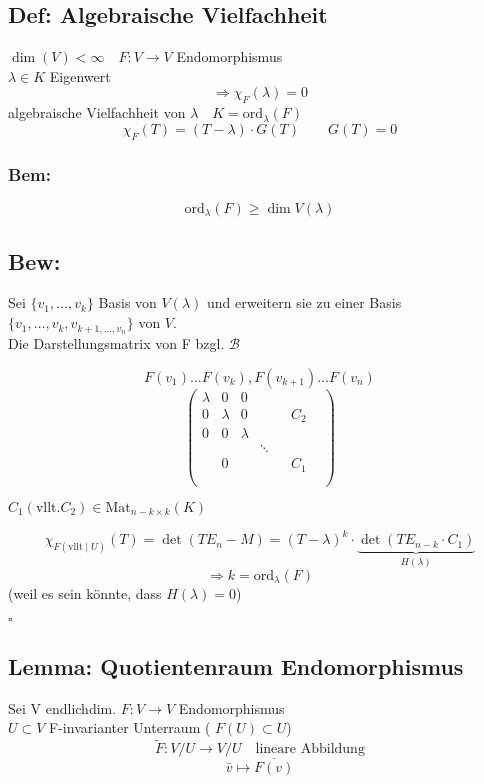 \documentclass[titlepage,12pt,a4paper,ngerman]{report}
\newcommand{\tx}[1]{\textrm{#1}}
\newcommand{\ov}[1]{\overline{#1}}
\begin{document}
\subsection{Def: Algebraische Vielfachheit}
$\dim(V)< \infty \quad F: V\to V$ Endomorphismus\\
$\lambda \in K$ Eigenwert\\
$$\Rightarrow \chi_{F}(\lambda) = 0$$
algebraische Vielfachheit von $\lambda \quad K = \textrm{ord}_\lambda(F)$
$$\chi_F(T) = (T-\lambda)\cdot G(T) \qquad G(T) = 0$$
\subsubsection{Bem:}
$$\textrm{ord}_\lambda(F) \ge \dim V(\lambda)$$
\subsection{Bew:}
Sei $ \{v_1,\dots,v_k\}$ Basis von $V(\lambda)$ und erweitern sie zu einer Basis \\
$\{v_1,\dots,v_k,v_{k+1, \dots , v_n}\}$ von $V$.\\
Die Darstellungsmatrix von F bzgl. $\mathcal{B}$ 

$$F(v_1) \dots F(v_k), F(v_{k+1}) \dots F(v_n)$$ 
\nopagebreak
$$\begin{pmatrix}
\lambda   &  0 & 0 & \\
0 & \lambda &  0 & & & C_2\\
0 & 0 &  \lambda & & \\
& & &  \ddots &  \\
& 0 & & & & C_1 & \\
& & & & & \\
\end{pmatrix} $$

$ C_1 (\tx{vllt.} C_2) \in \tx{Mat}_{n - k \times k} (K)$

$$\chi_{F(\tx{vllt} \mid U)}(T) = \det(TE_n-M) = (T-\lambda)^k\cdot \underbrace{\det(TE_{n-k} \cdot C_1)}_{H(\lambda)}$$
$$\Rightarrow k = \textrm{ord}_\lambda(F)$$
(weil es sein könnte, dass $H(\lambda) = 0$)
\begin{flushright}
	$\square$
\end{flushright}

\subsection{Lemma: Quotientenraum Endomorphismus}
Sei V endlichdim.
$F: V\to V$ Endomorphismus\\
$U \subset V$ F-invarianter Unterraum ( $F(U) \subset U$)\\
$$\tilde{F}: V/U \to V/U \quad \textrm{lineare Abbildung}$$
$$ \bar{v} \mapsto \ov{F(v)}$$
\end{document}
